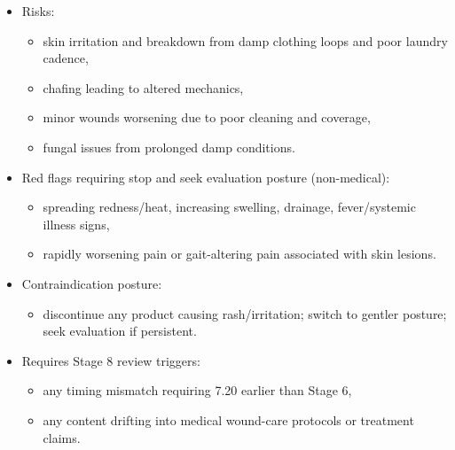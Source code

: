 \documentclass[10pt]{article}
\begin{document}
\begin{itemize}
\item Risks:
  \begin{itemize}
  \item skin irritation and breakdown from damp clothing loops and poor laundry cadence,
  \item chafing leading to altered mechanics,
  \item minor wounds worsening due to poor cleaning and coverage,
  \item fungal issues from prolonged damp conditions.
  \end{itemize}
\item Red flags requiring stop and seek evaluation posture (non-medical):
  \begin{itemize}
  \item spreading redness/heat, increasing swelling, drainage, fever/systemic illness signs,
  \item rapidly worsening pain or gait-altering pain associated with skin lesions.
  \end{itemize}
\item Contraindication posture:
  \begin{itemize}
  \item discontinue any product causing rash/irritation; switch to gentler posture; seek evaluation if persistent.
  \end{itemize}
\item Requires Stage 8 review triggers:
  \begin{itemize}
  \item any timing mismatch requiring 7.20 earlier than Stage 6,
  \item any content drifting into medical wound-care protocols or treatment claims.
  \end{itemize}
\end{itemize}
\end{document}
